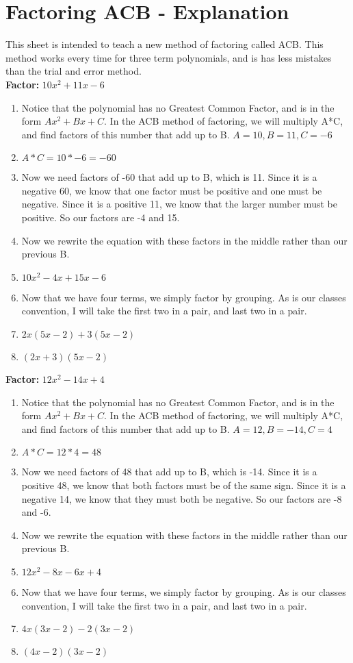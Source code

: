 \documentclass{article}
\begin{document}
\newpage
\section{Factoring ACB - Explanation}
This sheet is intended to teach a new method of factoring called ACB. This method works every time for three term polynomials, and is has less mistakes than the trial and error method. \\
\textbf{Factor:} $10x^{2} + 11x -6$
\begin{enumerate}
  \item Notice that the polynomial has no Greatest Common Factor, and is in the form $Ax^{2} + Bx + C$. In the ACB method of factoring, we will multiply A*C, and find factors of this number that add up to B. $A=10, B=11, C=-6$
  \item[] $A*C = 10*-6 = -60$
  \item Now we need factors of -60 that add up to B, which is 11. Since it is a negative 60, we know that one factor must be positive and one must be negative. Since it is a positive 11, we know that the larger number must be positive. So our factors are -4 and 15.
  \item Now we rewrite the equation with these factors in the middle rather than our previous B.
  \item[] $10x^{2} -4x + 15x -6$
  \item Now that we have four terms, we simply factor by grouping. As is our classes convention, I will take the first two in a pair, and last two in a pair.
  \item[] $2x(5x-2) + 3(5x-2)$
  \item[] $(2x+3)(5x-2)$
\end{enumerate}
\textbf{Factor:} $12x^{2} - 14x + 4$
\begin{enumerate}
  \item Notice that the polynomial has no Greatest Common Factor, and is in the form $Ax^{2} + Bx + C$. In the ACB method of factoring, we will multiply A*C, and find factors of this number that add up to B. $A=12, B=-14, C=4$
  \item[] $A*C = 12*4 = 48$
  \item Now we need factors of 48 that add up to B, which is -14. Since it is a positive 48, we know that both factors must be of the same sign. Since it is a negative 14, we know that they must both be negative. So our factors are -8 and -6.
  \item Now we rewrite the equation with these factors in the middle rather than our previous B.
  \item[] $12x^{2} - 8x - 6x +4$
  \item Now that we have four terms, we simply factor by grouping. As is our classes convention, I will take the first two in a pair, and last two in a pair.
  \item[] $4x(3x-2) - 2(3x-2)$
  \item[] $(4x-2)(3x-2)$
\end{enumerate}
\end{document}
